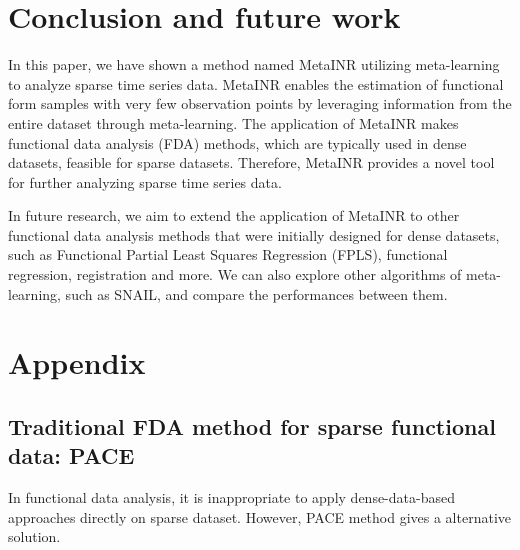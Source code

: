 \documentclass{article}
\begin{document}
\section{Conclusion and future work}
In this paper, we have shown a method named MetaINR utilizing meta-learning to analyze sparse time series data. 
MetaINR enables the estimation of functional form samples with very few observation points by leveraging information from the entire dataset through meta-learning. 
The application of MetaINR makes functional data analysis (FDA) methods, which are typically used in dense datasets, feasible for sparse datasets. 
Therefore, MetaINR provides a novel tool for further analyzing sparse time series data.

In future research, we aim to extend the application of MetaINR to other functional data analysis methods that were initially designed for dense datasets, such as Functional Partial Least Squares Regression (FPLS), functional regression, registration and more.
We can also explore other algorithms of meta-learning, such as SNAIL, and compare the performances between them.
\section{Appendix}

\subsection{Traditional FDA method for sparse functional data: PACE}
In functional data analysis, it is inappropriate to apply dense-data-based approaches directly on sparse dataset.
However, PACE method gives a alternative solution.
\end{document}
